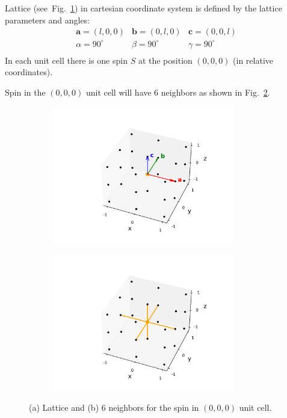 \documentclass[a4paper,12pt]{article}
\begin{document}
Lattice (see~Fig.~\ref{fig:lattice}) in cartesian coordinate system is defined by the lattice parameters and angles:
\begin{equation}
    \begin{matrix}
        \mathbf{a} = (l, 0, 0) & \mathbf{b} = (0, l, 0) & \mathbf{c} = (0, 0, l) \\
        \alpha = 90^{\circ} & \beta = 90^{\circ} & \gamma = 90^{\circ} \\
    \end{matrix}
\end{equation}
In each unit cell there is one spin $S$ at the position $(0, 0, 0)$ (in relative coordinates).

Spin in the $(0, 0, 0)$ unit cell will have 6 neighbors as shown in Fig.~\ref{fig:lattice-neighbors}.

\begin{figure}[H]
	\centering
	\begin{subfigure}[b]{0.49\textwidth}
		\centering
		\includegraphics[height=6cm]{lattice.pdf}
        \caption{}
	\label{fig:lattice}
	\end{subfigure}
	\hfill
	\begin{subfigure}[b]{0.49\textwidth}
		\centering
		\includegraphics[height=6cm]{lattice-neighbors.pdf}
	\caption{}
	\label{fig:lattice-neighbors}
	\end{subfigure}
	\hfill
	\caption{(a) Lattice and (b) 6 neighbors for the spin in $(0, 0, 0)$ unit cell.}
    \label{fig:lattice-both}
\end{figure}
\end{document}
